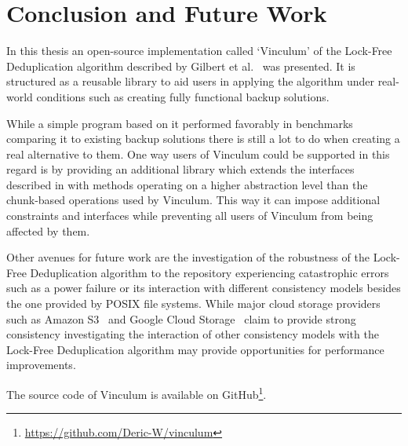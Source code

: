 \chapter{Conclusion and Future Work}\label{ch:conclusion}

In this thesis an open-source implementation called `Vinculum' of the Lock-Free
Deduplication algorithm described by Gilbert et al.~\cite{Duplicacy} was presented.
It is structured as a reusable library to aid users in applying the algorithm
under real-world conditions such as creating fully functional backup solutions.

While a simple program based on it performed favorably in benchmarks comparing
it to existing backup solutions there is still a lot to do when creating a real
alternative to them.
One way users of Vinculum could be supported in this regard is by providing
an additional library which extends the interfaces described in 
with methods operating on a higher abstraction level than the chunk-based operations
used by Vinculum.
This way it can impose additional constraints and interfaces while preventing all
users of Vinculum from being affected by them.

Other avenues for future work are the investigation of the robustness of the
Lock-Free Deduplication algorithm to the repository experiencing catastrophic
errors such as a power failure or its interaction with different consistency
models besides the one provided by POSIX file systems.
While major cloud storage providers such as Amazon S3~\cite{s3} and Google
Cloud Storage~\cite{GoogleCS} claim to provide strong consistency investigating
the interaction of other consistency models with the Lock-Free Deduplication
algorithm may provide opportunities for performance improvements.

The source code of Vinculum is available on GitHub\footnote{\url{https://github.com/Deric-W/vinculum}}.
